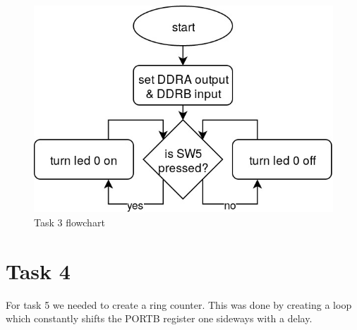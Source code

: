 \documentclass[a4paper,12pt]{article}
\begin{document}
\break
\begin{figure}
\begin{center}
\includegraphics[width=\textwidth/2 ]{flowchart/task3_flowchart.jpg}
\end{center}
\caption{Task 3 flowchart}
\label{task3}
\end{figure}

\break

\section{Task 4}
For task 5 we needed to create a ring counter. This was done by creating a loop which constantly shifts the PORTB register one sideways with a delay.

\lstset{style=Asm}
\end{document}
